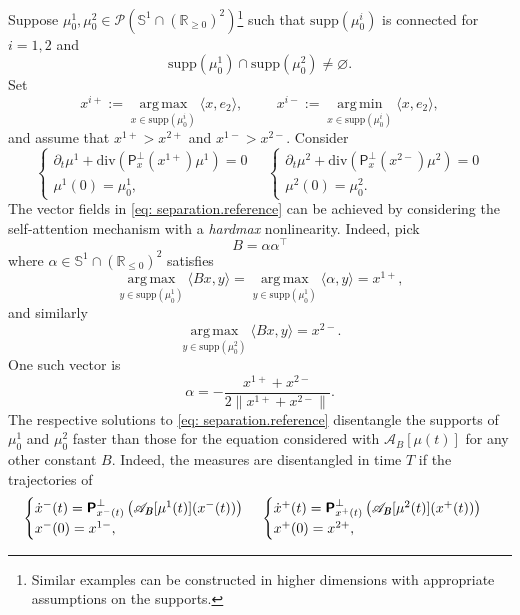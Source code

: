 \documentclass[a4paper,11pt]{article}
\theoremstyle{plain}
\newcommand{\supp}{\mathrm{supp}}
\newcommand{\argmax}{\mathop{\mathrm{arg\,max}}\limits}
\newcommand{\argmin}{\mathop{\mathrm{arg\,min}}\limits}
\newcommand{\proj}{\bm{\mathsf{P}}^\perp}
\newcommand{\dive}{\mathrm{div}}
\newcommand{\bB}{\bm{\mathit{B}}}
\renewcommand{\leq}{\leqslant}
\renewcommand{\geq}{\geqslant}
\numberwithin{equation}{section}
\begin{document}
Suppose $\mu_0^1,\mu_0^2\in\mathscr{P}(\mathbb{S}^1\cap (\mathbb{R}_{\geq0})^2)$\footnote{Similar examples can be constructed in higher dimensions with appropriate assumptions on the supports.} such that $\supp(\mu_0^i)$ is connected for $i=1,2$ and
\begin{equation*}
    \supp(\mu_0^1)\cap\supp(\mu_0^2)\neq \varnothing.
\end{equation*}
Set
\begin{equation*}
    x^{i+}:=\argmax_{x\in \supp(\mu_0^i)}\langle x,e_2\rangle,\hspace{1cm} x^{i-}:=\argmin_{x\in \supp(\mu_0^i)}\langle x,e_2\rangle,
\end{equation*}
and assume that $x^{1+}>x^{2+}$ and $x^{1-}>x^{2-}$. Consider
\begin{equation} \label{eq: separation.reference}
\begin{cases}
        \partial_t \mu^1+\dive\left(\proj_x(x^{1+})\mu^1\right)=0\\
    \mu^1(0)=\mu_0^1,
\end{cases}\quad\begin{cases}
        \partial_t \mu^2+\dive\left(\proj_x(x^{2-})\mu^2\right)=0\\
    \mu^2(0)=\mu_0^2.
\end{cases}
\end{equation}
The vector fields in \eqref{eq: separation.reference} can be achieved by considering the self-attention mechanism with a \emph{hardmax} nonlinearity. Indeed, pick 
\begin{equation*}
\bB = \alpha\alpha^\top
\end{equation*}
where $\alpha\in\mathbb{S}^1\cap(\mathbb{R}_{\leq0})^2$ satisfies
\begin{equation*}
    \argmax_{y\in\supp(\mu_0^1)}\langle \bB x,y\rangle=\argmax_{y\in\supp(\mu_0^1)}\langle  \alpha,y\rangle = x^{1+},
\end{equation*}
and similarly
\begin{equation*}
    \argmax_{y\in\supp(\mu_0^2)}\langle \bB x,y\rangle = x^{2-}.
\end{equation*}
One such vector is $$\alpha=-\frac{x^{1+}+x^{2-}}{2\|x^{1+}+x^{2-}\|}.$$ 
The respective solutions to \eqref{eq: separation.reference} disentangle the supports of $\mu_0^1$ and $\mu_0^2$ faster than those for the equation considered with $\mathscr{A}_{\bB}[\mu(t)]$ for any other constant $\bB$. 
Indeed, the measures are disentangled in time $T$ if the trajectories of
\begin{equation*}
\begin{cases}
    \dot{x}^{-}(t)=\proj_{x^{-}(t)}\left(\mathscr{A}_{\bB}[\mu^1(t)](x^{-}(t))\right)\\
    x^-(0)=x^{1-},
    \end{cases}\hspace{0.05cm}
\begin{cases}
    \dot{x}^{+}(t)=\proj_{x^{+}(t)}\left(\mathscr{A}_{\bB}[\mu^2(t)](x^{+}(t))\right)\\
    x^+(0)=x^{2+},
    \end{cases}
\end{equation*}
\end{document}
